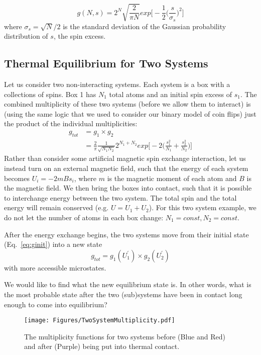 \begin{equation}
g(N,s) = 2^N \sqrt{\frac{2}{\pi N}} exp\bigg[-\frac{1}{2}\bigg(\frac{s}{\sigma_s}\bigg)^2\bigg]
\end{equation}
where $\sigma_s = \sqrt{N}/2$ is the standard deviation of the Gaussian probability 
distribution of $s$, the spin excess.

\subsection{Thermal Equilibrium for Two Systems}
Let us consider two non-interacting systems. Each system is a box with a collections of
spins. Box 1 has $N_1$ total atoms and an initial spin excess of $s_1$.
The combined multiplicity of these 
two systems (before we allow them to interact) is (using the same logic that we used to consider
our binary model of coin flips) just the product of the individual multiplicities:
\begin{align}
g_{tot} &= g_1 \times g_2 \\
        &= \frac{2}{\pi} \frac{1}{\sqrt{N_1 N_2}} 2^{N_1 + N_2} exp\bigg[-2\bigg(\frac{s_1^2}{N_1} + 
        \frac{s_2^2}{N_2}\bigg)\bigg]
\label{eq:ginit}
\end{align}
Rather than consider some artificial magnetic spin exchange interaction, let us instead
turn on an external magnetic field, such that the energy of each system becomes
$U_i = -2 m B s_i$, where $m$ is the magnetic moment of each atom and $B$ is the magnetic
field. We then bring the boxes into contact, such that it is possible to interchange energy
between the two system. The total spin and the total energy will remain conserved
(e.g. $U = U_1 + U_2$). For this two system example, we do not let the number of atoms in
each box change: $N_1 = const, N_2 = const$.

After the energy exchange begins, the two systems move from their 
initial state (Eq.~\ref{eq:ginit}) into a new state
\begin{equation}
g_{tot} = g_1(U_1^\prime) \times g_2(U_2^\prime)
\end{equation}
with more accessible microstates.

We would like to find what the new equilibrium state is. In other words, 
what is the most probable state after the two (sub)systems have been in contact 
long enough to come into equilibrium?
\begin{figure}[h]
\centering
\texttt{[image: Figures/TwoSystemMultiplicity.pdf]}
\caption{The multiplicity functions for two systems before (Blue and Red) and after (Purple) being put 
	into thermal contact.}
\end{figure}

